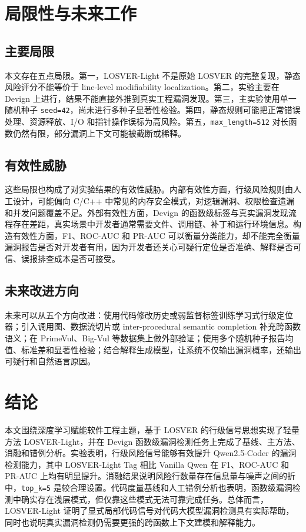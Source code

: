 \documentclass[10pt]{article}
\newcommand{\methodname}{LOSVER-Light}
\begin{document}
\section{局限性与未来工作}

\subsection{主要局限}

本文存在五点局限。第一，\methodname{} 不是原始 LOSVER 的完整复现，静态风险评分不能等价于 line-level modifiability localization。第二，实验主要在 Devign 上进行，结果不能直接外推到真实工程漏洞发现。第三，主实验使用单一随机种子 \texttt{seed=42}，尚未进行多种子显著性检验。第四，静态规则可能把正常错误处理、资源释放、I/O 和指针操作误标为高风险。第五，\texttt{max\_length=512} 对长函数仍然有限，部分漏洞上下文可能被截断或稀释。

\subsection{有效性威胁}

这些局限也构成了对实验结果的有效性威胁。内部有效性方面，行级风险规则由人工设计，可能偏向 C/C++ 中常见的内存安全模式，对逻辑漏洞、权限检查遗漏和并发问题覆盖不足。外部有效性方面，Devign 的函数级标签与真实漏洞发现流程存在差距，真实场景中开发者通常需要文件、调用链、补丁和运行环境信息。构造有效性方面，F1、ROC-AUC 和 PR-AUC 可以衡量分类能力，却不能完全衡量漏洞报告是否对开发者有用，因为开发者还关心可疑行定位是否准确、解释是否可信、误报排查成本是否可接受。

\subsection{未来改进方向}

未来可以从五个方向改进：使用代码修改历史或弱监督标签训练学习式行级定位器；引入调用图、数据流切片或 inter-procedural semantic completion 补充跨函数语义；在 PrimeVul、Big-Vul 等数据集上做外部验证；使用多个随机种子报告均值、标准差和显著性检验；结合解释生成模型，让系统不仅输出漏洞概率，还输出可疑行和自然语言原因。

\section{结论}

本文围绕深度学习赋能软件工程主题，基于 LOSVER 的行级信号思想实现了轻量方法 \methodname{}，并在 Devign 函数级漏洞检测任务上完成了基线、主方法、消融和错例分析。实验表明，行级风险信号能够有效提升 Qwen2.5-Coder 的漏洞检测能力，其中 \methodname{} Tag 相比 Vanilla Qwen 在 F1、ROC-AUC 和 PR-AUC 上均有明显提升。消融结果说明风险行数量存在信息量与噪声之间的折中，\texttt{top\_k=5} 是较合理设置。代码度量基线和人工错例分析也表明，函数级漏洞检测中确实存在浅层模式，但仅靠这些模式无法可靠完成任务。总体而言，\methodname{} 证明了显式局部代码信号对代码大模型漏洞检测具有实际帮助，同时也说明真实漏洞检测仍需要更强的跨函数上下文建模和解释能力。



\end{document}
